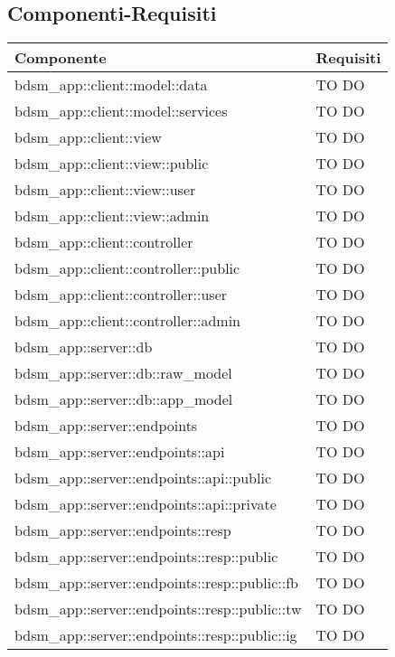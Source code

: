 \subsection{Componenti-Requisiti} %
\label{sub:componenti_requisiti}
\begin{center}
\def\arraystretch{1.5}
\bgroup
\begin{longtable}{| p{9cm} | p{4cm} |}
\hline
\textbf{Componente} & \textbf{Requisiti} \\
\hline
bdsm\_app::client::model::data  &  TO DO \\
\hline
bdsm\_app::client::model::services  &  TO DO \\
\hline
bdsm\_app::client::view  &  TO DO \\
\hline
bdsm\_app::client::view::public  &  TO DO \\
\hline
bdsm\_app::client::view::user  &  TO DO \\
\hline
bdsm\_app::client::view::admin  &  TO DO \\
\hline
bdsm\_app::client::controller  &  TO DO \\
\hline
bdsm\_app::client::controller::public  &  TO DO \\
\hline
bdsm\_app::client::controller::user  &  TO DO \\
\hline
bdsm\_app::client::controller::admin  &  TO DO \\
\hline
bdsm\_app::server::db  &  TO DO \\
\hline
bdsm\_app::server::db::raw\_model  &  TO DO \\
\hline
bdsm\_app::server::db::app\_model  &  TO DO \\
\hline
bdsm\_app::server::endpoints  &  TO DO \\
\hline
bdsm\_app::server::endpoints::api  &  TO DO \\
\hline
bdsm\_app::server::endpoints::api::public  &  TO DO \\
\hline
bdsm\_app::server::endpoints::api::private  &  TO DO \\
\hline
bdsm\_app::server::endpoints::resp  &  TO DO \\
\hline
bdsm\_app::server::endpoints::resp::public  &  TO DO \\
\hline
bdsm\_app::server::endpoints::resp::public::fb  &  TO DO \\
\hline
bdsm\_app::server::endpoints::resp::public::tw  &  TO DO \\
\hline
bdsm\_app::server::endpoints::resp::public::ig  &  TO DO \\
\hline

\end{longtable}
\end{center}
